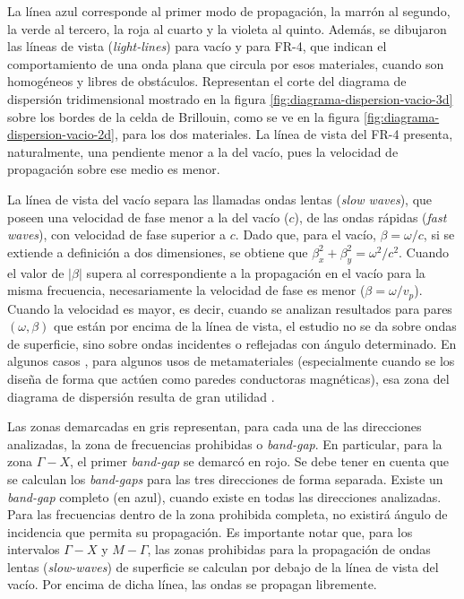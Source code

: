 La línea azul corresponde al primer modo de propagación, la marrón al segundo, la verde al tercero, la roja al cuarto y la violeta al quinto. Además, se dibujaron las líneas de vista (\textit{light-lines}) para vacío y para FR-4, que indican el comportamiento de una onda plana que circula por esos materiales, cuando son homogéneos y libres de obstáculos. Representan el corte del diagrama de dispersión tridimensional mostrado en la figura \ref{fig:diagrama-dispersion-vacio-3d} sobre los bordes de la celda de Brillouin, como se ve en la figura \ref{fig:diagrama-dispersion-vacio-2d}, para los dos materiales. La línea de vista del FR-4 presenta, naturalmente, una pendiente menor a la del vacío, pues la velocidad de propagación sobre ese medio es menor.

La línea de vista del vacío separa las llamadas ondas lentas (\textit{slow waves}), que poseen una velocidad de fase menor a la del vacío ($c$), de las ondas rápidas (\textit{fast waves}), con velocidad de fase superior a $c$. Dado que, para el vacío, $\beta=\omega/c$, si se extiende a definición a dos dimensiones, se obtiene que $\beta_x^2 + \beta_y^2 = \omega^2/c^2$. Cuando el valor de $|\beta|$ supera al correspondiente a la propagación en el vacío para la misma frecuencia, necesariamente la velocidad de fase es menor ($\beta = \omega / v_p$). Cuando la velocidad es mayor, es decir, cuando se analizan resultados para pares $(\omega,\beta)$ que están por encima de la línea de vista, el estudio no se da sobre ondas de superficie, sino sobre ondas incidentes o reflejadas con ángulo determinado. En algunos casos \cite{Maci:Pole-zero-matching}, para algunos usos de metamateriales (especialmente cuando se los diseña de forma que actúen como paredes conductoras magnéticas), esa zona del diagrama de dispersión resulta de gran utilidad \cite{Yang:EBGAntennas}.

Las zonas demarcadas en gris representan, para cada una de las direcciones analizadas, la zona de frecuencias prohibidas o \textit{band-gap}. En particular, para la zona $\Gamma-X$, el primer \textit{band-gap} se demarcó en rojo. Se debe tener en cuenta que se calculan los \textit{band-gaps} para  las tres direcciones de forma separada. Existe un \textit{band-gap} completo (en azul), cuando existe en todas las direcciones analizadas. Para las frecuencias dentro de la zona prohibida completa, no existirá ángulo de incidencia que permita su propagación. Es importante notar que, para los intervalos $\Gamma-X$ y $M-\Gamma$, las zonas prohibidas para la propagación de ondas lentas (\textit{slow-waves}) de superficie se calculan por debajo de la línea de vista del vacío. Por encima de dicha línea, las ondas se propagan libremente.

